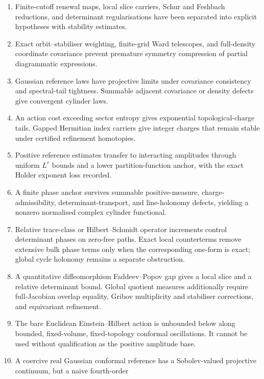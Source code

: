 \documentclass[11pt]{article}
\theoremstyle{remark}
\begin{document}
\begin{enumerate}[leftmargin=2.2em]
\item Finite-cutoff renewal maps, local slice carriers, Schur and
      Feshbach reductions, and determinant regularisations have been
      separated into explicit hypotheses with stability estimates.
\item Exact orbit--stabiliser weighting, finite-grid Ward telescopes,
      and full-density coordinate covariance prevent premature
      symmetry compression of partial diagrammatic expressions.
\item Gaussian reference laws have projective limits under covariance
      consistency and spectral-tail tightness.  Summable adjacent
      covariance or density defects give convergent cylinder laws.
\item An action cost exceeding sector entropy gives exponential
      topological-charge tails.  Gapped Hermitian index carriers give
      integer charges that remain stable under certified refinement
      homotopies.
\item Positive reference estimates transfer to interacting amplitudes
      through uniform \(L^r\) bounds and a lower partition-function
      anchor, with the exact Holder exponent loss recorded.
\item A finite phase anchor survives summable positive-measure,
      charge-admissibility, determinant-transport, and line-holonomy
      defects, yielding a nonzero normalised complex cylinder
      functional.
\item Relative trace-class or Hilbert--Schmidt operator increments
      control determinant phases on zero-free paths.  Exact local
      counterterms remove extensive bulk phase terms only when the
      corresponding one-form is exact; global cycle holonomy remains
      a separate obstruction.
\item A quantitative diffeomorphism Faddeev--Popov gap gives a local
      slice and a relative determinant bound.  Global quotient
      measures additionally require full-Jacobian overlap equality,
      Gribov multiplicity and stabiliser corrections, and equivariant
      refinement.
\item The bare Euclidean Einstein--Hilbert action is unbounded below
      along bounded, fixed-volume, fixed-topology conformal
      oscillations.  It cannot be used without qualification as the
      positive amplitude base.
\item A coercive real Gaussian conformal reference has a
      Sobolev-valued projective continuum, but a naive fourth-order

\end{enumerate}
\end{document}
